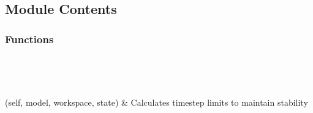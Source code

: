 \documentclass[letterpaper,10pt,english]{sphinxmanual}
\begin{document}
\subsection{Module Contents}
\label{\detokenize{autoapi/stability_fast/index:module-contents}}

\subsubsection{Functions}
\label{\detokenize{autoapi/stability_fast/index:functions}}

\begin{savenotes}\sphinxatlongtablestart\begin{longtable}[c]{}
\hline

\endfirsthead

%
{}\\
\hline

\endhead

\hline
{}\\
\endfoot

\endlastfoot

\sphinxAtStartPar
{\hyperref[\detokenize{autoapi/stability_fast/index:stability_fast.stability}]{}}(self, model, workspace, state)
&
\sphinxAtStartPar
Calculates timestep limits to maintain stability
\\
\hline
\end{longtable}\sphinxatlongtableend\end{savenotes}
\end{document}
